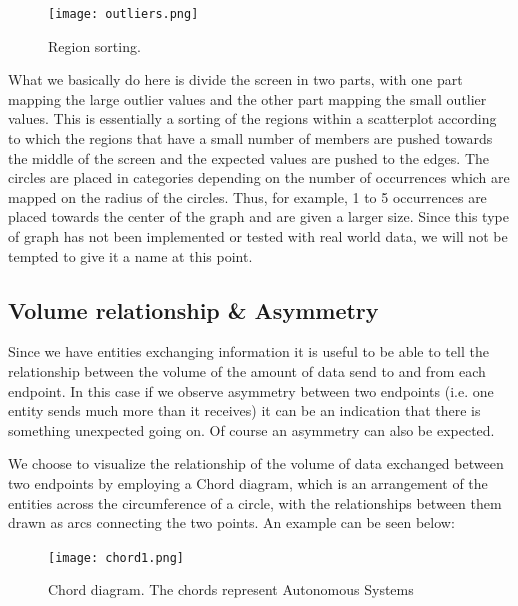 \documentclass[16pt]{extreport}
\begin{document}
\begin{center}
	\begin{figure}[h]
		\texttt{[image: outliers.png]}
		\caption[]{Region sorting.}
		\label{fig:det}
	\end{figure}
\end{center}
\clearpage
\parbox{\linewidth}{
\justify
\large{What we basically do here is divide the screen in two parts, with one part mapping the large outlier values and the other part mapping the small outlier values. This is essentially a sorting of the regions within a scatterplot according to which the regions that have a small number of members are pushed towards the middle of the screen and the expected values are pushed to the edges. The circles are placed in categories depending on the number of occurrences which are mapped on the radius of the circles. Thus, for example, 1 to 5 occurrences are placed towards the center of the graph and are given a larger size. Since this type of graph has not been implemented or tested with real world data, we will not be tempted to give it a name at this point.}}

\subsection{Volume relationship \& Asymmetry}

\parbox{\linewidth}{
\justify
\large{
Since we have entities exchanging information it is useful to be able to tell the relationship between the volume of the amount of data send to and from each endpoint. In this case if we observe asymmetry between two endpoints (i.e. one entity sends much more than it receives) it can be an indication that there is something unexpected going on. Of course an asymmetry can also be expected. }}

\parbox{\linewidth}{
\justify
\large{
We choose to visualize the relationship of the volume of data exchanged between two endpoints by employing a Chord diagram, which is an arrangement of the entities across the circumference of a circle, with the relationships between them drawn as arcs connecting the two points. An example can be seen below:
}}

\begin{center}
	\begin{figure}[h]
		\centering
		\texttt{[image: chord1.png]}
		\caption[]{Chord diagram. The chords represent Autonomous Systems}
		\label{fig:det}
	\end{figure}
\end{center}
\clearpage
\end{document}
